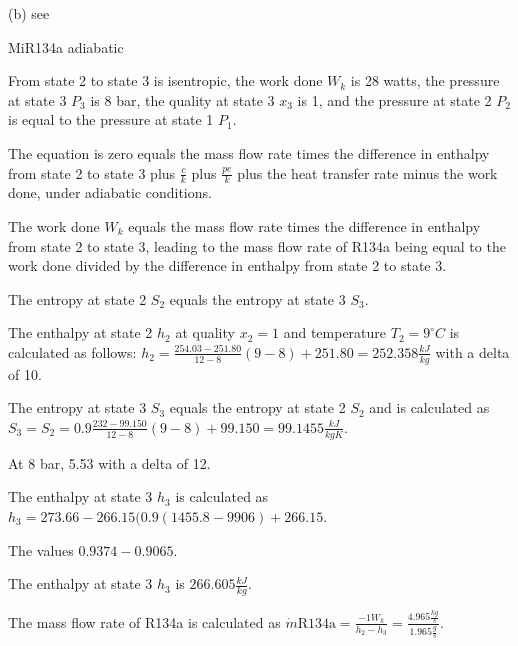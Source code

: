 (b) see

MiR134a adiabatic

From state 2 to state 3 is isentropic, the work done \( W_k \) is 28 watts, the pressure at state 3 \( P_3 \) is 8 bar, the quality at state 3 \( x_3 \) is 1, and the pressure at state 2 \( P_2 \) is equal to the pressure at state 1 \( P_1 \).

The equation is zero equals the mass flow rate times the difference in enthalpy from state 2 to state 3 plus \( \frac{c}{k} \) plus \( \frac{pe}{k} \) plus the heat transfer rate minus the work done, under adiabatic conditions.

The work done \( W_k \) equals the mass flow rate times the difference in enthalpy from state 2 to state 3, leading to the mass flow rate of R134a being equal to the work done divided by the difference in enthalpy from state 2 to state 3.

The entropy at state 2 \( S_2 \) equals the entropy at state 3 \( S_3 \).

The enthalpy at state 2 \( h_2 \) at quality \( x_2 = 1 \) and temperature \( T_2 = 9^\circ C \) is calculated as follows: \( h_2 = \frac{254.03 - 251.80}{12 - 8} (9 - 8) + 251.80 = 252.358 \frac{kJ}{kg} \) with a delta of 10.

The entropy at state 3 \( S_3 \) equals the entropy at state 2 \( S_2 \) and is calculated as \( S_3 = S_2 = 0.9 \frac{232 - 99.150}{12 - 8} (9 - 8) + 99.150 = 99.1455 \frac{kJ}{kgK} \).

At 8 bar, 5.53 with a delta of 12.

The enthalpy at state 3 \( h_3 \) is calculated as \( h_3 = 273.66 - 266.15 (0.9 (1455.8 - 9906) + 266.15 \).

The values \( 0.9374 - 0.9065 \).

The enthalpy at state 3 \( h_3 \) is \( 266.605 \frac{kJ}{kg} \).

The mass flow rate of R134a is calculated as \( \dot{m} \text{R134a} = \frac{-1 W_k}{h_2 - h_3} = \frac{4.965 \frac{kg}{s}}{1.965 \frac{g}{s}} \).